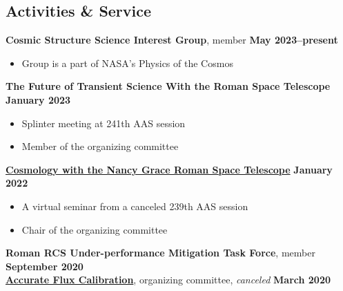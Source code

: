 \documentclass[margin]{res}
\begin{document}
\begin{resume}
\section{Activities \& Service} %


\textbf{Cosmic Structure Science Interest Group}, member \hfill \textbf{May 2023--present}
\begin{itemize}\itemsep -2pt
    \item[] Group is a part of NASA's Physics of the Cosmos
\end{itemize}\vspace{-12pt}
\textbf{The Future of Transient Science With the Roman Space Telescope} \hfill \textbf{January 2023}
\begin{itemize}\itemsep -2pt
    \item[] Splinter meeting at 241th AAS session
    \item[] Member of the organizing committee
\end{itemize} \vspace{-12pt}
\textbf{\href{https://roman.gsfc.nasa.gov/science/2022_cosmology_seminar.html}{Cosmology with the Nancy Grace Roman Space Telescope}} \hfill \textbf{January 2022}
\begin{itemize}\itemsep -2pt
    \item[] A virtual seminar from a canceled 239th AAS session
    \item[] Chair of the organizing committee
\end{itemize} \vspace{-12pt}
\textbf{Roman RCS Under-performance Mitigation Task Force}, member \hfill \textbf{September 2020}\\
\textbf{\href{https://www.stsci.edu/contents/events/stsci/2020/march/accurate-flux-calibration-for-21st-century-astrophysics?timeframe=}{Accurate Flux Calibration}}, organizing committee, \textit{canceled} \hfill \textbf{March 2020}\\

\end{resume}
\end{document}
